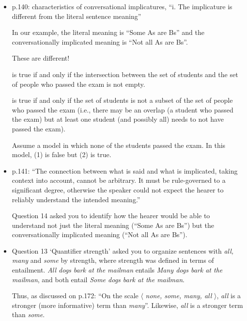 \documentclass[a4,11pt]{article}
\begin{document}
\begin{itemize}[leftmargin = 12pt]

\item p.140: characteristics of conversational implicatures, ``i. The implicature is different from the literal sentence meaning''

In our example, the literal meaning is ``Some As are Bs'' and the conversationally implicated meaning is ``Not all As are Bs''. 

These are different!

\begin{exe}
 is true if and only if the intersection between the set of students and the set of people who passed the exam is not empty. 

 is true if and only if the set of students is not a subset of the set of people who passed the exam (i.e., there may be an overlap (a student who passed the exam) but at least one student (and possibly all) needs to not have passed the exam).

\end{exe}

Assume a model in which none of the students passed the exam. In this model, (1) is false but (2) is true.

\item p.141: ``The connection between what is said and what is implicated, taking context into account, cannot be arbitrary. It must be rule-governed to a significant degree, otherwise the speaker could not expect the hearer to reliably understand the intended meaning.''

Question 14 asked you to identify how the hearer would be able to understand not just the literal meaning (``Some As are Bs'') but the conversationally implicated meaning (``Not all As are Bs'').

\item Question 13 `Quantifier strength' asked you to organize sentences with {\em all, many} and {\em some} by strength, where strength was defined in terms of entailment. {\em All dogs bark at the mailman} entails {\em Many dogs bark at the mailman}, and both entail {\em Some dogs bark at the mailman}. 

Thus, as discussed on p.172: ``On the scale $\langle$ {\em none, some, many, all} $\rangle$, {\em all} is a stronger (more informative) term than {\em many}''. Likewise, {\em all} is a stronger term than {\em some}.


\end{itemize}
\end{document}
